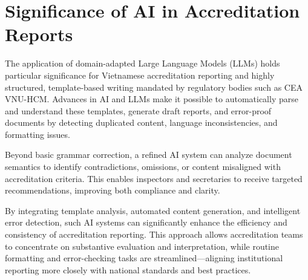 \section{Significance of AI in Accreditation Reports}
The application of domain-adapted Large Language Models (LLMs) holds particular significance for Vietnamese accreditation reporting and highly structured, template-based writing mandated by regulatory bodies such as CEA VNU-HCM. Advances in AI and LLMs make it possible to automatically parse and understand these templates, generate draft reports, and error-proof documents by detecting duplicated content, language inconsistencies, and formatting issues.

Beyond basic grammar correction, a refined AI system can analyze document semantics to identify contradictions, omissions, or content misaligned with accreditation criteria. This enables inspectors and secretaries to receive targeted recommendations, improving both compliance and clarity.

By integrating template analysis, automated content generation, and intelligent error detection, such AI systems can significantly enhance the efficiency and consistency of accreditation reporting. This approach allows accreditation teams to concentrate on substantive evaluation and interpretation, while routine formatting and error-checking tasks are streamlined—aligning institutional reporting more closely with national standards and best practices.

